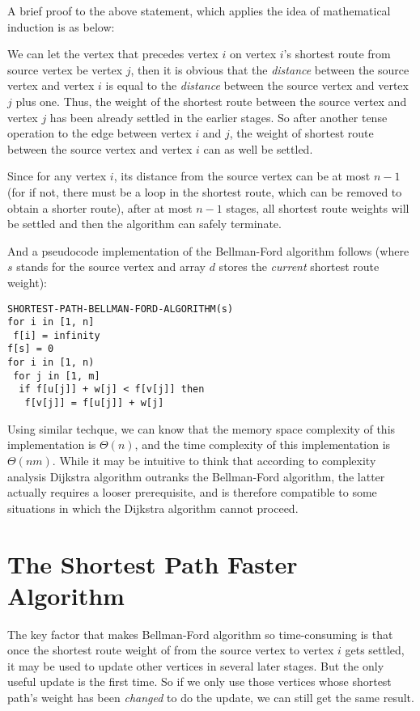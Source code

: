 \documentclass[a4paper,11pt,twocolumn]{article}
\begin{document}
A brief proof to the above statement, which applies the idea of mathematical induction is as below: 

We can let the vertex that precedes vertex $i$ on vertex $i$'s shortest route from source vertex be vertex $j$, then it is obvious that the \emph{distance} between the source vertex and vertex $i$ is equal to the \emph{distance} between the source vertex and vertex $j$ plus one. Thus, the weight of the shortest route between the source vertex and vertex $j$ has been already settled in the earlier stages. So after another tense operation to the edge between vertex $i$ and $j$, the weight of shortest route between the source vertex and vertex $i$ can as well be settled. 

Since for any vertex $i$, its distance from the source vertex can be at most $n - 1$ (for if not, there must be a loop in the shortest route, which can be removed to obtain a shorter route), after at most $n - 1$ stages, all shortest route weights will be settled and then the algorithm can safely terminate. 

And a pseudocode implementation of the Bellman-Ford algorithm follows (where $s$ stands for the source vertex and array $d$ stores the \emph{current} shortest route weight):

\begin{verbatim}
SHORTEST-PATH-BELLMAN-FORD-ALGORITHM(s)
for i in [1, n]
 f[i] = infinity
f[s] = 0
for i in [1, n)
 for j in [1, m]
  if f[u[j]] + w[j] < f[v[j]] then
   f[v[j]] = f[u[j]] + w[j]
\end{verbatim}

Using similar techque, we can know that the memory space complexity of this implementation is $\Theta(n)$, and the time complexity of this implementation is $\Theta(nm)$. While it may be intuitive to think that according to complexity analysis Dijkstra algorithm outranks the Bellman-Ford algorithm, the latter actually requires a looser prerequisite, and is therefore compatible to some situations in which the Dijkstra algorithm cannot proceed. 

\section{The Shortest Path Faster Algorithm}

The key factor that makes Bellman-Ford algorithm so time-consuming is that once the shortest route weight of from the source vertex to vertex $i$ gets settled, it may be used to update other vertices in several later stages. But the only useful update is the first time. So if we only use those vertices whose shortest path's weight has been \emph{changed} to do the update, we can still get the same result. 
\end{document}

